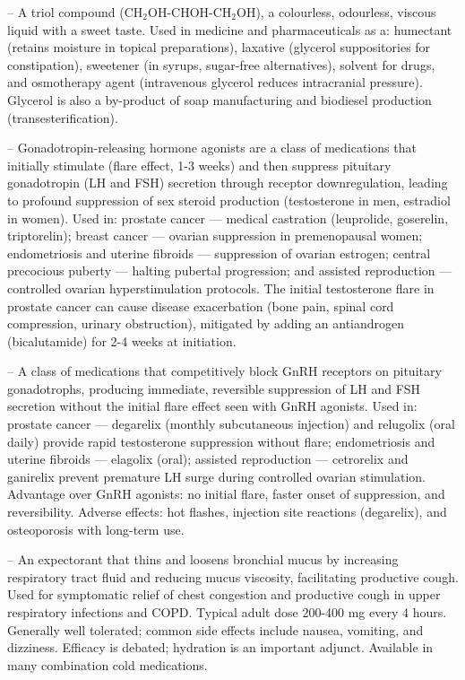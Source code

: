 -- A triol compound (CH$_2$OH-CHOH-CH$_2$OH), a colourless, odourless, viscous liquid with a sweet taste. Used in medicine and pharmaceuticals as a: humectant (retains moisture in topical preparations), laxative (glycerol suppositories for constipation), sweetener (in syrups, sugar-free alternatives), solvent for drugs, and osmotherapy agent (intravenous glycerol reduces intracranial pressure). Glycerol is also a by-product of soap manufacturing and biodiesel production (transesterification).

-- Gonadotropin-releasing hormone agonists are a class of medications that initially stimulate (flare effect, 1-3 weeks) and then suppress pituitary gonadotropin (LH and FSH) secretion through receptor downregulation, leading to profound suppression of sex steroid production (testosterone in men, estradiol in women). Used in: prostate cancer — medical castration (leuprolide, goserelin, triptorelin); breast cancer — ovarian suppression in premenopausal women; endometriosis and uterine fibroids — suppression of ovarian estrogen; central precocious puberty — halting pubertal progression; and assisted reproduction — controlled ovarian hyperstimulation protocols. The initial testosterone flare in prostate cancer can cause disease exacerbation (bone pain, spinal cord compression, urinary obstruction), mitigated by adding an antiandrogen (bicalutamide) for 2-4 weeks at initiation.

-- A class of medications that competitively block GnRH receptors on pituitary gonadotrophs, producing immediate, reversible suppression of LH and FSH secretion without the initial flare effect seen with GnRH agonists. Used in: prostate cancer — degarelix (monthly subcutaneous injection) and relugolix (oral daily) provide rapid testosterone suppression without flare; endometriosis and uterine fibroids — elagolix (oral); assisted reproduction — cetrorelix and ganirelix prevent premature LH surge during controlled ovarian stimulation. Advantage over GnRH agonists: no initial flare, faster onset of suppression, and reversibility. Adverse effects: hot flashes, injection site reactions (degarelix), and osteoporosis with long-term use.

-- An expectorant that thins and loosens bronchial mucus by increasing respiratory tract fluid and reducing mucus viscosity, facilitating productive cough. Used for symptomatic relief of chest congestion and productive cough in upper respiratory infections and COPD. Typical adult dose 200-400 mg every 4 hours. Generally well tolerated; common side effects include nausea, vomiting, and dizziness. Efficacy is debated; hydration is an important adjunct. Available in many combination cold medications.

